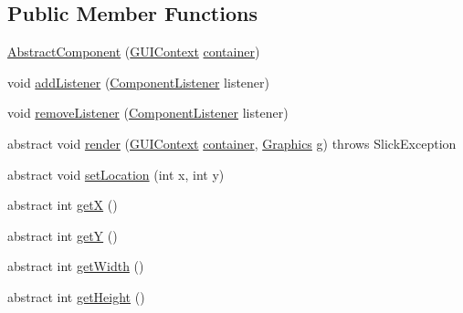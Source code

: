 \subsection*{Public Member Functions}
\begin{DoxyCompactItemize}
\item 
\mbox{\hyperlink{classorg_1_1newdawn_1_1slick_1_1gui_1_1_abstract_component_a8ee8763659ee9d2ac917601c98dfe907}{Abstract\+Component}} (\mbox{\hyperlink{interfaceorg_1_1newdawn_1_1slick_1_1gui_1_1_g_u_i_context}{G\+U\+I\+Context}} \mbox{\hyperlink{classorg_1_1newdawn_1_1slick_1_1gui_1_1_abstract_component_af6d1abaa24da0b9a06fb153722e15435}{container}})
\item 
void \mbox{\hyperlink{classorg_1_1newdawn_1_1slick_1_1gui_1_1_abstract_component_aa3bc3dddf346a26d8e26555106f2bae6}{add\+Listener}} (\mbox{\hyperlink{interfaceorg_1_1newdawn_1_1slick_1_1gui_1_1_component_listener}{Component\+Listener}} listener)
\item 
void \mbox{\hyperlink{classorg_1_1newdawn_1_1slick_1_1gui_1_1_abstract_component_a263171ae72ff34fc5c17c8dd3bbf178a}{remove\+Listener}} (\mbox{\hyperlink{interfaceorg_1_1newdawn_1_1slick_1_1gui_1_1_component_listener}{Component\+Listener}} listener)
\item 
abstract void \mbox{\hyperlink{classorg_1_1newdawn_1_1slick_1_1gui_1_1_abstract_component_af2f66829fb28f1c9f27acfc6f1be2445}{render}} (\mbox{\hyperlink{interfaceorg_1_1newdawn_1_1slick_1_1gui_1_1_g_u_i_context}{G\+U\+I\+Context}} \mbox{\hyperlink{classorg_1_1newdawn_1_1slick_1_1gui_1_1_abstract_component_af6d1abaa24da0b9a06fb153722e15435}{container}}, \mbox{\hyperlink{classorg_1_1newdawn_1_1slick_1_1_graphics}{Graphics}} g)  throws Slick\+Exception
\item 
abstract void \mbox{\hyperlink{classorg_1_1newdawn_1_1slick_1_1gui_1_1_abstract_component_a2cc82d8f8d0fddc059af2e60853f085a}{set\+Location}} (int x, int y)
\item 
abstract int \mbox{\hyperlink{classorg_1_1newdawn_1_1slick_1_1gui_1_1_abstract_component_a9b0ebb0eb32e92db4475960bb5ceec19}{getX}} ()
\item 
abstract int \mbox{\hyperlink{classorg_1_1newdawn_1_1slick_1_1gui_1_1_abstract_component_aaae887135b1574e5b9bb73ee867c2244}{getY}} ()
\item 
abstract int \mbox{\hyperlink{classorg_1_1newdawn_1_1slick_1_1gui_1_1_abstract_component_ab09e022b383b64e6b82dd03525a7efc9}{get\+Width}} ()
\item 
abstract int \mbox{\hyperlink{classorg_1_1newdawn_1_1slick_1_1gui_1_1_abstract_component_aa0963ca601fb01163572a9b3e05afd00}{get\+Height}} ()

\end{DoxyCompactItemize}
